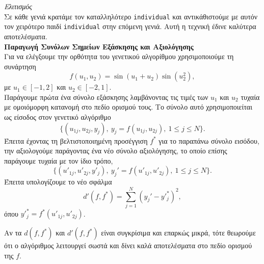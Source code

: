 \documentclass[12pt]{article}
\begin{document}
\textit{Ελιτισμός} \\
Σε κάθε γενιά κρατάμε τον καταλληλότερο \texttt{individual} και αντικάθιστούμε με αυτόν τον χειρότερο παιδί \texttt{individual} στην επόμενη γενιά. Αυτή η τεχνική έδινε καλύτερα αποτελέσματα. \\

\textbf{Παραγωγή Συνόλων Σημείων Εξάσκησης και Αξιολόγησης} \\
Για να ελέγξουμε την ορθότητα του γενετικού αλγορίθμου χρησιμοποιούμε τη συνάρτηση 
\[
f(u_1, u_2) = \sin(u_1 + u_2) \sin(u_2^2)
,\]
με $u_1 \in [-1, 2]$ και $u_2 \in [-2, 1]$. \\
Παράγουμε πρώτα ένα σύνολο εξάσκησης λαμβάνοντας τις τιμές των $u_1$ και $u_2$ τυχαία με ομοιόμορφη κατανομή στο πεδίο ορισμού τους. Το σύνολο αυτό χρησιμοποιείται ως είσοδος στον γενετικό αλγόριθμο
\[
\{(u_{1j}, u_{2j}, y_j),\: y_j = f(u_{1j}, u_{2j}), \: 1 \leq j \leq N\}.
\]
Έπειτα έχοντας τη βελτιστοποιημένη προσέγγιση $f^*$ για το παραπάνω σύνολο εισόδου, την αξιολογούμε παράγοντας ένα νέο σύνολο αξιολόγησης, το οποίο επίσης παράγουμε τυχαία με τον ίδιο τρόπο, 
\[
\{(u'_{1j}, u'_{2j}, y'_j),\: y_j' = f(u'_{1j}, u'_{2j}), \: 1 \leq j \leq N\}.
\]
Έπειτα υπολογίζουμε το νέο σφάλμα
\[
d'(f, f^*) = \sum_{j=1}^{N} (y_j' - y'^*_j)^2
,\]
όπου \(y'^*_j = f^*(u'_{1j}, u'_{2j})\). 

Αν τα $d(f, f^*)$ και $d'(f, f^*)$ είναι συγκρίσιμα και επαρκώς μικρά, τότε θεωρούμε ότι ο αλγόριθμος λειτουργεί σωστά και δίνει καλά αποτελέσματα στο πεδίο ορισμού της $f$. \\
\end{document}
